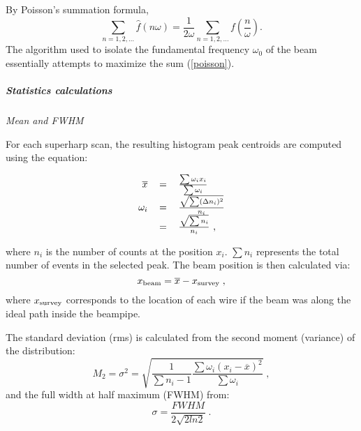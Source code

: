 {By Poisson's summation formula, 
\begin{equation}\label{poisson}
\sum_{n=1, 2,\ldots} \hat f(n\omega) =
	\frac{1}{2\omega}\sum_{n=1, 2, \ldots} f\left(\frac{n}{\omega}\right).
\end{equation}
The algorithm used to isolate the fundamental frequency $\omega_0$ of the beam essentially attempts to
maximize the sum (\ref{poisson}).

	\subparagraph{Statistics calculations}

	{\sl Mean and FWHM}

For each superharp scan, the resulting histogram peak centroids are computed using the equation:
\begin{center}
\begin{equation}
\begin{tabular}{rcl}
$\overline{x}$&$ = $&$ \frac{\sum \omega_i x_i}{\sum \omega_i}	$\\
$\omega_i    $&$ = $&$ \frac{\sqrt{\sum (\Delta n_i)^2}}{n_i} $\\
              &$ = $&$ \frac{\sqrt{\sum n_i}}{n_i} $\ ,
\end{tabular}
\end{equation}
\end{center}
\noindent
where $n_i$ is the number of counts at the position $x_i$. $\sum n_i$ represents
the total number of events in the selected peak. The beam position is then calculated via:
\begin{equation}
x_{\rm beam} = \overline{x} - x_{\rm survey} \; ,
\end{equation}
where $x_{\rm survey}$ corresponds to the location of each wire if the beam was along the
ideal path inside the beampipe.

The standard deviation (rms) is calculated from the second moment (variance) of the
distribution:
\begin{equation}
M_2 = \sigma^2 =
	\sqrt{\frac{1}{\sum n_i-1}\frac{\sum \omega_i (x_i-\overline{x})^2}{\sum \omega_i}} \; ,
\end{equation}
and the full width at half maximum (FWHM) from:
\begin{equation}
\sigma = \frac{FWHM}{2\sqrt{2ln2}} \; .
\end{equation}

}
